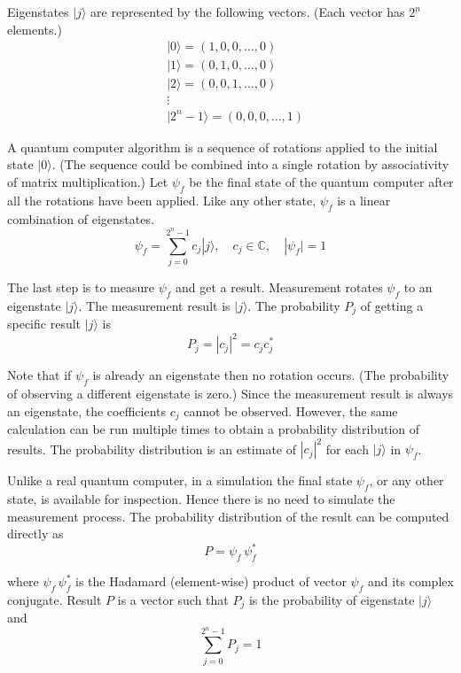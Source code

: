 \documentclass[12pt]{article}
\begin{document}
\bigskip
Eigenstates $|j\rangle$ are represented by the following vectors.
(Each vector has $2^n$ elements.)
\begin{align*}
&|0\rangle=(1,0,0,\dots,0)
\\
&|1\rangle=(0,1,0,\ldots,0)
\\
&|2\rangle=(0,0,1,\ldots,0)
\\
&\vdots
\\
&|2^n-1\rangle=(0,0,0,\ldots,1)
\end{align*}

A quantum computer algorithm is a sequence of rotations
applied to the initial state $|0\rangle$.
(The sequence could be combined into a single rotation
by associativity of matrix multiplication.)
Let $\psi_f$ be the final state of the quantum computer
after all the rotations have been applied.
Like any other state, $\psi_f$ is a linear combination of eigenstates.
\begin{equation*}
\psi_f=\sum_{j=0}^{2^n-1}c_j|j\rangle,
\quad
c_j\in\mathbb C,
\quad
|\psi_f|=1
\end{equation*}

The last step is to measure $\psi_f$ and get a result.
Measurement rotates $\psi_f$ to an eigenstate $|j\rangle$.
The measurement result is $|j\rangle$.
The probability $P_j$ of getting a specific result $|j\rangle$ is
\begin{equation*}
P_j=|c_j|^2=c_jc_j^*
\end{equation*}

Note that if $\psi_f$ is already an eigenstate then no rotation occurs.
(The probability of observing a different eigenstate is zero.)
Since the measurement result is always an eigenstate,
the coefficients $c_j$ cannot be observed.
However, the same calculation can be run multiple times
to obtain a probability distribution of results.
The probability distribution is an estimate
of $|c_j|^2$ for each $|j\rangle$ in $\psi_f$.

\bigskip
Unlike a real quantum computer, in a simulation
the final state $\psi_f$, or any other state, is available for inspection.
Hence there is no need to simulate the measurement process.
The probability distribution of the result can be computed directly as
\begin{equation*}
P=\psi_f\,\psi_f^*
\end{equation*}

where $\psi_f\,\psi_f^*$
is the Hadamard (element-wise) product of vector $\psi_f$ and its complex conjugate.
Result $P$ is a vector such that $P_j$ is the
probability of eigenstate $|j\rangle$ and
\begin{equation*}
\sum_{j=0}^{2^n-1} P_j=1
\end{equation*}
\end{document}
